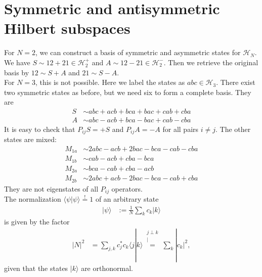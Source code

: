 \documentclass[english, parskip=full]{scrartcl}
\newcommand{\kom}{}
\newcommand{\brak}{}
\newcommand{\Ket}{}
\begin{document}
\section{Symmetric and antisymmetric Hilbert subspaces}
For $N=2$, we can construct a basis of symmetric and asymmetric states for $\mathcal{H}_N$. 
We have $S\sim 12+21\in\mathcal{H}_2^+$ and $A\sim 12-21\in\mathcal{H}_2^-$.
Then we retrieve the original basis by $12\sim S+A$ and $21\sim S-A$.
\\
For $N=3$, this is not possible. 
Here we label the states as $abc\in\mathcal{H}_3$.
There exist two symmetric states as before, but we need six to form a complete basis. 
They are
\begin{align*}
S&\sim abc + acb + bca + bac + cab + cba\\
A&\sim abc - acb + bca - bac + cab - cba
\end{align*}
It is easy to check that $P_{ij}S=+S$ and $P_{ij}A=-A$ for all pairs $i\neq j$.
The other states are mixed:
\begin{align*}
M_{1a}&\sim 2abc - acb + 2bac - bca - cab - cba\\
M_{1b}&\sim cab - acb + cba - bca\\
M_{2a}&\sim bca - cab + cba - acb\\
M_{2b}&\sim 2abc + acb - 2bac - bca - cab + cba
\end{align*}
They are not eigenstates of all $P_{ij}$ operators.
\\
The normalization $\brak\langle {\psi}| {\psi}\rangle\overset{!}{=}1$ of an arbitrary state 
\begin{align*}
\Ket | {\psi} \rangle&:=\frac{1}{N}\sum_{k}c_k\Ket | {k} \rangle
\end{align*}
is given by the factor
\begin{align*}
|N|^2&=\sum_{j,k}c_j^\ast c_k\brak\langle {j}| {k}\rangle\kom\overset{\substack{{j\perp k} \\ |}}{=}\sum_k |c_k|^2,
\end{align*}
given that the states $\Ket | {k} \rangle$ are orthonormal.
\end{document}
